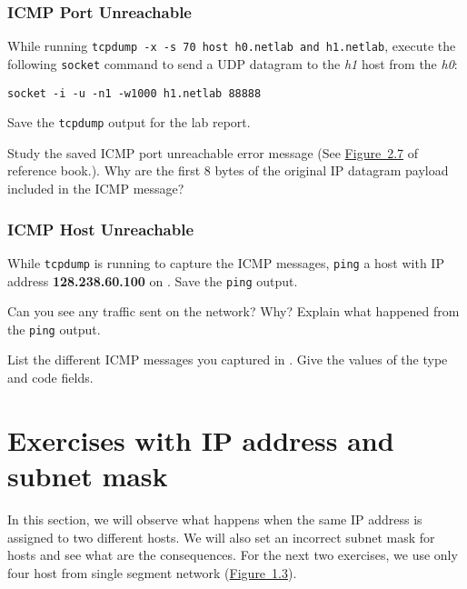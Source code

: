 \documentclass{../UTNetLab}
\begin{document}
\section{ICMP Port Unreachable}
    While running \lstinline[emph={h0,h1,netlab}]{tcpdump -x -s 70 host h0.netlab and h1.netlab}, execute the following \lstinline{socket} command to send a UDP datagram to the \textit{h1} host from the \textit{h0}:

    \begin{lstlisting}[emph={h0,h1,netlab}]
socket -i -u -n1 -w1000 h1.netlab 88888
    \end{lstlisting}

    Save the \lstinline{tcpdump} output for the lab report.

    \begin{report}
        \item Study the saved ICMP port unreachable error message (See \hyperref[fig:2.7]{Figure~2.7} of reference book.).
            Why are the first 8 bytes of the original IP datagram payload included in the ICMP message?
    \end{report}

\section{ICMP Host Unreachable}
    While \lstinline{tcpdump} is running to capture the ICMP messages, \lstinline{ping} a host with IP address \textbf{128.238.60.100} on .
    Save the \lstinline{ping} output.
    
    \begin{report}
        \item Can you see any traffic sent on the network? Why? Explain what happened from the \lstinline{ping} output.

        \item List the different ICMP messages you captured in .
            Give the values of the type and code fields.
    \end{report}

\part{Exercises with IP address and subnet mask}
    In this section, we will observe what happens when the same IP address is assigned to two different hosts.
    We will also set an incorrect subnet mask for hosts and see what are the consequences.
    For the next two exercises, we use only four host from single segment network (\hyperref[fig:1.3]{Figure~1.3}).
\end{document}
